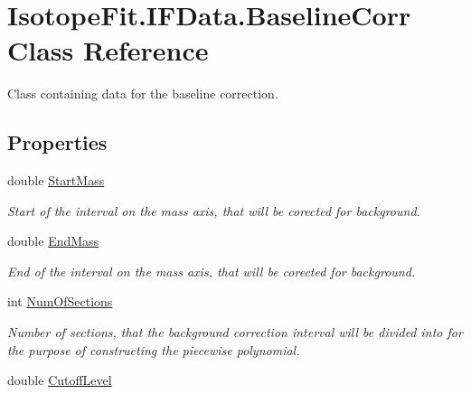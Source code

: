 \hypertarget{class_isotope_fit_1_1_i_f_data_1_1_baseline_corr}{}\section{Isotope\+Fit.\+I\+F\+Data.\+Baseline\+Corr Class Reference}
\label{class_isotope_fit_1_1_i_f_data_1_1_baseline_corr}


Class containing data for the baseline correction.  


\subsection*{Properties}
\begin{DoxyCompactItemize}
\item 
double \mbox{\hyperlink{class_isotope_fit_1_1_i_f_data_1_1_baseline_corr_a9c464d39ab74e62c887b450002256902}{Start\+Mass}}
\begin{DoxyCompactList}\small\item\em Start of the interval on the mass axis, that will be corected for background. \end{DoxyCompactList}\item 
double \mbox{\hyperlink{class_isotope_fit_1_1_i_f_data_1_1_baseline_corr_a3ddf6fd1df96bc69336b4b6822ad7e4f}{End\+Mass}}
\begin{DoxyCompactList}\small\item\em End of the interval on the mass axis, that will be corected for background. \end{DoxyCompactList}\item 
int \mbox{\hyperlink{class_isotope_fit_1_1_i_f_data_1_1_baseline_corr_a61f4eeb14295a1d2ba1b80dd36163505}{Num\+Of\+Sections}}
\begin{DoxyCompactList}\small\item\em Number of sections, that the background correction interval will be divided into for the purpose of constructing the piecewise polynomial. \end{DoxyCompactList}\item 
double \mbox{\hyperlink{class_isotope_fit_1_1_i_f_data_1_1_baseline_corr_a74196174b782a5c1b7a7f4377b0ff451}{Cutoff\+Level}}

\end{DoxyCompactItemize}
